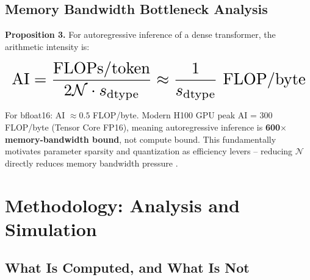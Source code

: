 \documentclass[10pt,twocolumn,letterpaper]{article}
\begin{document}
\subsection{Memory Bandwidth Bottleneck Analysis}


\textbf{Proposition 3.} For autoregressive inference of a dense transformer, the arithmetic intensity is:























\begin{equation}
\resizebox{\columnwidth}{!}{$\displaystyle
\begin{aligned}
\text{AI} = \frac{\text{FLOPs/token}}{2\mathcal{N} \cdot s_{\text{dtype}}} \approx \frac{1}{s_{\text{dtype}}} \text{ FLOP/byte}
\end{aligned}
$}
\end{equation}























For bfloat16: AI $\approx 0.5$ FLOP/byte. Modern H100 GPU peak AI = 300 FLOP/byte (Tensor Core FP16), meaning autoregressive inference is \textbf{600$\times$ memory-bandwidth bound}, not compute bound. This fundamentally motivates parameter sparsity and quantization as efficiency levers -- reducing $\mathcal{N}$ directly reduces memory bandwidth pressure \cite{arxiv_2406_00584}.




\section{Methodology: Analysis and Simulation}



\subsection{What Is Computed, and What Is Not}
\end{document}
